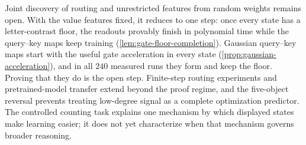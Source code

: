Joint discovery of routing and unrestricted features from random weights remains open. With the value features fixed, it
reduces to one step: once every state has a letter-contrast floor, the readouts provably finish in polynomial time while the
query--key maps keep training (\cref{lem:gate-floor-completion}). Gaussian query--key maps start with the useful gate acceleration in
every state (\cref{prop:gaussian-acceleration}), and in all $240$ measured runs they form and keep the floor. Proving that they do is the open step.
Finite-step routing experiments and pretrained-model transfer extend beyond the proof regime,
and the five-object reversal prevents treating low-degree signal as a complete optimization
predictor. The controlled counting task explains one mechanism by which displayed states
make learning easier; it does not yet characterize when that mechanism governs broader reasoning.
